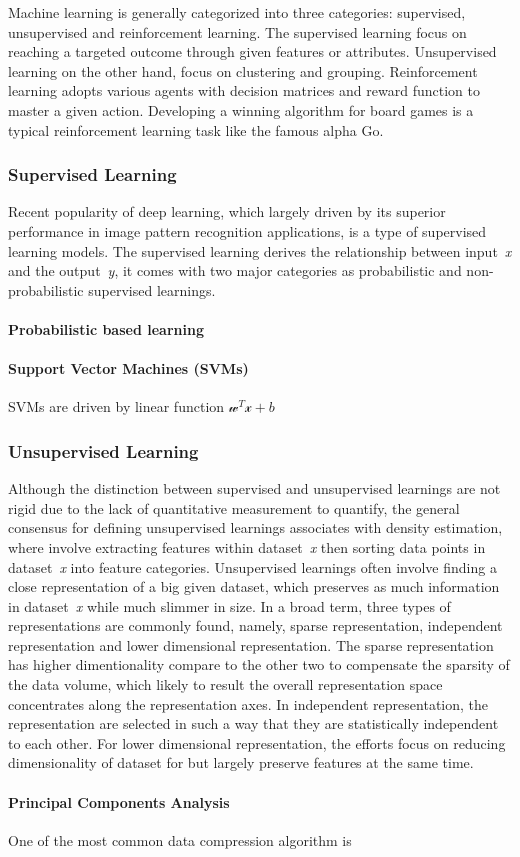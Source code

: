 Machine learning is generally categorized into three categories: supervised, unsupervised and reinforcement learning. The supervised learning focus on reaching a targeted outcome through given features or attributes. Unsupervised learning on the other hand, focus on clustering and grouping. Reinforcement learning adopts various agents with decision matrices and reward function to master a given action. Developing a winning algorithm for board games is a typical reinforcement learning task like the famous alpha Go.
\par

\subsubsection{Supervised Learning}

Recent popularity of deep learning, which largely driven by its superior performance in image pattern recognition applications, is a type of supervised learning models. The supervised learning  derives the relationship between input~\textit{x} and the output~\textit{y}, it comes with two major categories as probabilistic and non-probabilistic supervised learnings. 

\paragraph{Probabilistic based learning}
\paragraph{Support Vector Machines (SVMs)}
SVMs are driven by linear function $\mathcal{w}^T\mathcal{x}+b$ 

\subsubsection{Unsupervised Learning}
Although the distinction between supervised and unsupervised learnings are not rigid due to the lack of quantitative measurement to quantify, the general consensus for defining unsupervised learnings associates with density estimation, where involve extracting features within dataset~\textit{x} then sorting data points in dataset~\textit{x} into feature categories.
Unsupervised learnings often involve finding a close representation of a big given  dataset, which preserves as much information in dataset~\textit{x} while much slimmer in size. In a broad term, three types of representations are commonly found, namely, sparse representation, independent representation and lower dimensional representation. The sparse representation~\cite{Barlow_1989,Olshausen_1996,Hinton_1997} has higher dimentionality compare to the other two to compensate the sparsity of the data volume, which likely to result the overall representation space concentrates along the representation axes. In independent representation, the representation are selected in such a way that they are statistically independent to each other. For lower dimensional representation, the efforts focus on reducing dimensionality of dataset for but largely preserve features at the same time. 

\paragraph{Principal Components Analysis }
One of the most common data compression algorithm is 